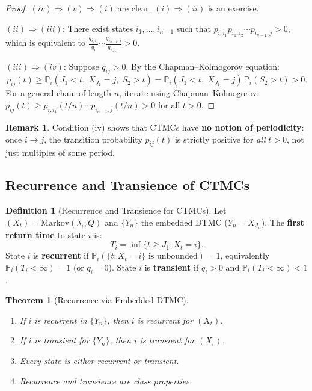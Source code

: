 \documentclass[12pt, a4paper]{article}
\theoremstyle{definition}
\newtheorem{definition}{Definition}[section]
\newtheorem{remark}{Remark}[section]
\theoremstyle{plain}
\newtheorem{theorem}{Theorem}[section]
\newcommand{\PP}{\mathbb{P}}
\begin{document}
\begin{proof}
$(iv) \Rightarrow (v) \Rightarrow (i)$ are clear. $(i) \Rightarrow (ii)$ is an exercise.

$(ii) \Rightarrow (iii)$: There exist states $i_1,\ldots,i_{n-1}$ such that $p_{i,i_1}p_{i_1,i_2}\cdots p_{i_{n-1},j} > 0$, which is equivalent to $\frac{q_{i,i_1}}{q_i}\cdots\frac{q_{i_{n-1},j}}{q_{i_{n-1}}} > 0$.

$(iii) \Rightarrow (iv)$: Suppose $q_{ij} > 0$. By the Chapman--Kolmogorov equation:
\[
p_{ij}(t) \ge \PP_i(J_1 < t,\; X_{J_1} = j,\; S_2 > t) = \PP_i(J_1 < t,\; X_{J_1} = j)\,\PP_i(S_2 > t) > 0.
\]
For a general chain of length $n$, iterate using Chapman--Kolmogorov: $p_{ij}(t) \ge p_{i,i_1}(t/n)\cdots p_{i_{n-1},j}(t/n) > 0$ for all $t > 0$.
\end{proof}

\begin{remark}
Condition (iv) shows that CTMCs have \textbf{no notion of periodicity}: once $i \to j$, the transition probability $p_{ij}(t)$ is strictly positive for \emph{all} $t > 0$, not just multiples of some period.
\end{remark}

\subsection{Recurrence and Transience of CTMCs}

\begin{definition}[Recurrence and Transience for CTMCs]
Let $(X_t) = \text{Markov}(\lambda_i, Q)$ and $\{Y_n\}$ the embedded DTMC ($Y_n = X_{J_n}$). The \textbf{first return time} to state $i$ is:
\[
T_i = \inf\{t \ge J_1 : X_t = i\}.
\]
State $i$ is \textbf{recurrent} if $\PP_i(\{t: X_t = i\} \text{ is unbounded}) = 1$, equivalently $\PP_i(T_i < \infty) = 1$ (or $q_i = 0$). State $i$ is \textbf{transient} if $q_i > 0$ and $\PP_i(T_i < \infty) < 1$.
\end{definition}

\begin{theorem}[Recurrence via Embedded DTMC]
\begin{enumerate}[label=(\roman*)]
  \item If $i$ is recurrent in $\{Y_n\}$, then $i$ is recurrent for $(X_t)$.
  \item If $i$ is transient for $\{Y_n\}$, then $i$ is transient for $(X_t)$.
  \item Every state is either recurrent or transient.
  \item Recurrence and transience are class properties.
\end{enumerate}
\end{theorem}
\end{document}
